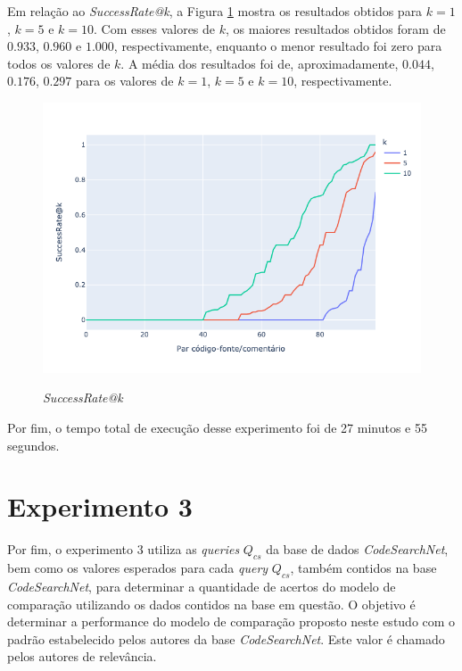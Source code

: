 Em relação ao \textit{SuccessRate@k}, a Figura \ref{fig:experiment-2-success-k} mostra os resultados obtidos para $k=1$, $k=5$ e $k=10$. Com esses valores de $k$, os maiores resultados obtidos foram de $0.933$, $0.960$ e $1.000$, respectivamente, enquanto o menor resultado foi zero para todos os valores de $k$. A média dos resultados foi de, aproximadamente, $0.044$, $0.176$, $0.297$ para os valores de $k=1$, $k=5$ e $k=10$, respectivamente.

\begin{figure}[H]
  \centering
      \caption{\textit{SuccessRate@k}}
      \includegraphics[scale=0.6]{imagens/resultados/experiment-2/success-rates.png}
      \label{fig:experiment-2-success-k}
\end{figure}

Por fim, o tempo total de execução desse experimento foi de 27 minutos e 55 segundos.

\section{Experimento 3} 
\label{sec:results:experiment-3}
Por fim, o experimento 3 utiliza as \textit{queries} $Q_{cs}$ da base de dados \textit{CodeSearchNet}, bem como os valores esperados para cada \textit{query} $Q_{cs}$, também contidos na base \textit{CodeSearchNet}, para determinar a quantidade de acertos do modelo de comparação utilizando os dados contidos na base em questão. O objetivo é determinar a performance do modelo de comparação proposto neste estudo com o padrão estabelecido pelos autores da base \textit{CodeSearchNet}. Este valor é chamado pelos autores de relevância.

